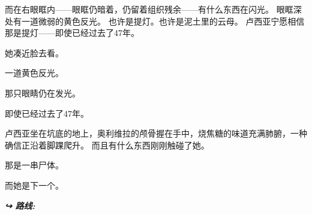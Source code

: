 \noindent 而在右眼眶内——眼眶仍暗着，仍留着组织残余——有什么东西在闪光。
\noindent 眼眶深处有一道微弱的黄色反光。
\noindent 也许是提灯。也许是泥土里的云母。
\noindent 卢西亚宁愿相信那是提灯——即使已经过去了47年。

\noindent 她凑近脸去看。

\noindent 一道黄色反光。

\noindent 那只眼睛仍在发光。

\noindent 即使已经过去了47年。

\noindent 卢西亚坐在坑底的地上，奥利维拉的颅骨握在手中，烧焦糖的味道充满肺腑，一种确信正沿着脚踝爬升。
\noindent 而且有什么东西刚刚触碰了她。

\noindent 那是一串尸体。

\noindent 而她是下一个。

\vspace{0.5em}
\noindent\textit{\textbf{↪ 路线:}  \rotasep {}}
